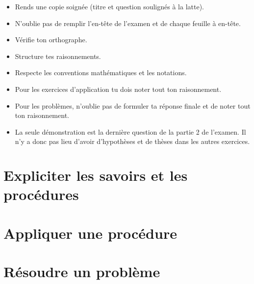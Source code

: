 \documentclass[a4paper, 12pt, parskip=half-]{scrartcl}
\begin{document}
\entete
{}
\begin{itemize}
    \item Rends une copie soignée (titre et question soulignés à la latte).
    \item N'oublie pas de remplir l'en-tête de l'examen et de chaque feuille à en-tête.
    \item Vérifie ton orthographe.
    \item Structure tes raisonnements.
    \item Respecte les conventions mathématiques et les notations.
    \item Pour les exercices d'application tu dois noter tout ton raisonnement.
    \item Pour les problèmes, n'oublie pas de formuler ta réponse finale et de noter tout ton raisonnement.
    \item La seule démonstration est la dernière question de la partie 2 de l'examen. Il n'y a donc pas lieu d'avoir d'hypothèses et de thèses dans les autres exercices.
\end{itemize}
\newpage
\section{Expliciter les savoirs et les procédures}

\newpage
\section{Appliquer une procédure}

\newpage
\section{Résoudre un problème}

\end{document}

